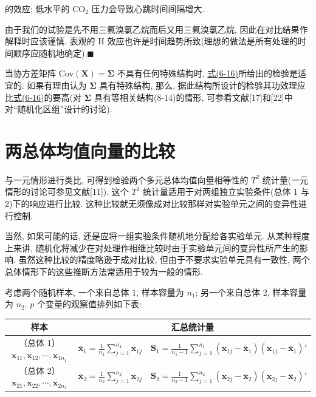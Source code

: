的效应; 低水平的 $\mathrm{CO}_{2}$ 压力会导致心跳时间间隔增大.

由于我们的试验是先不用三氟溴氯乙烷而后又用三氟溴氯乙烷, 因此在对比结果作解释时应该谨慎. 表观的 H 效应也许是时间趋势所致(理想的做法是所有处理的时间顺序应随机地确定).\hfill$\blacksquare$

当协方差矩阵 $\mathrm{Cov}(\mathbf{X})=\boldsymbol{\Sigma}$ 不具有任何特殊结构时, \hyperref[eq:6-16]{式(6-16)}所给出的检验是适宜的. 如果有理由认为 $\boldsymbol{\Sigma}$ 具有特殊结构, 那么, 据此结构所设计的检验其功效理应比\hyperref[eq:6-16]{式(6-16)}的要高(对 $\boldsymbol{\Sigma}$ 具有等相关结构(8-14)的情形, 可参看文献[17]和[22]中对“随机化区组”设计的讨论).

\section{两总体均值向量的比较}
\label{sec:6.3}

与一元情形进行类比, 可得到检验两个多元总体均值向量相等性的 $T^{2}$ 统计量(一元情形的讨论可参见文献[11]). 这个 $T^{2}$ 统计量适用于对两组独立实验条件(总体 1 与 2)下的响应进行比较. 这种比较就无须像成对比较那样对实验单元之间的变异性进行控制.

当然, 如果可能的话, 还是应将一组实验条件随机地分配给各实验单元. 从某种程度上来讲, 随机化将减少在对处理作相继比较时由于实验单元间的变异性所产生的影响. 虽然这种比较的精度略逊于成对比较, 但由于不要求实验单元具有一致性, 两个总体情形下的这些推断方法常适用于较为一般的情形.

考虑两个随机样本, 一个来自总体 1, 样本容量为 $n_{1}$; 另一个来自总体 2, 样本容量为 $n_{2}$. $p$ 个变量的观察值排列如下表:

\begin{mvtable}
\centering
{\small
\begin{tabular}{ccc}
\toprule
样本 & \multicolumn{2}{c}{汇总统计量}\\
\midrule
\makecell{（总体 1）\\ $\mathbf{x}_{11},\mathbf{x}_{12},\cdots,\mathbf{x}_{1n_{1}}$} & $\displaystyle \bar{\mathbf{x}}_{1}=\frac{1}{n_{1}}\sum_{j=1}^{n_{1}}\mathbf{x}_{1j}$ & $\displaystyle \mathbf{S}_{1}=\frac{1}{n_{1}-1}\sum_{j=1}^{n_{1}}(\mathbf{x}_{1j}-\bar{\mathbf{x}}_{1})(\mathbf{x}_{1j}-\bar{\mathbf{x}}_{1})'$\\
\makecell{（总体 2）\\ $\mathbf{x}_{21},\mathbf{x}_{22},\cdots,\mathbf{x}_{2n_{2}}$} & $\displaystyle \bar{\mathbf{x}}_{2}=\frac{1}{n_{2}}\sum_{j=1}^{n_{2}}\mathbf{x}_{2j}$ & $\displaystyle \mathbf{S}_{2}=\frac{1}{n_{2}-1}\sum_{j=1}^{n_{2}}(\mathbf{x}_{2j}-\bar{\mathbf{x}}_{2})(\mathbf{x}_{2j}-\bar{\mathbf{x}}_{2})'$\\
\bottomrule
\end{tabular}}
\end{mvtable}

